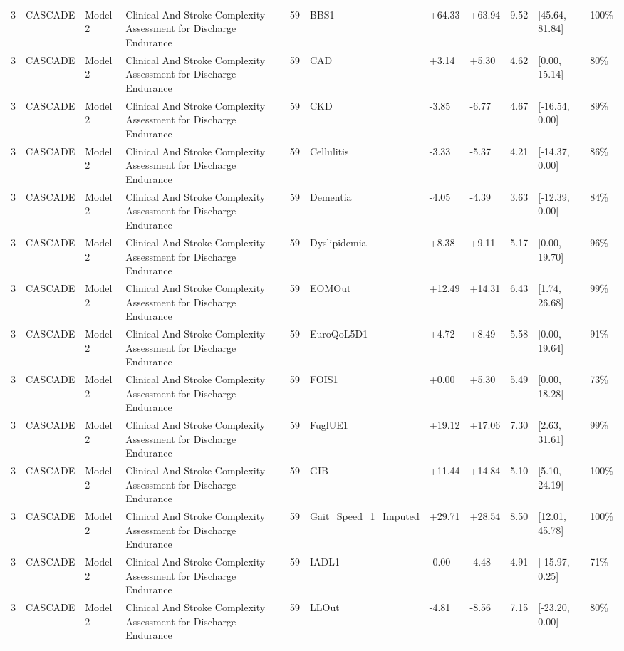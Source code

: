 \begin{tabular}{lllllllllll}
3 & CASCADE & Model 2 & Clinical And Stroke Complexity Assessment for Discharge Endurance & 59 & BBS1 & +64.33 & +63.94 & 9.52 & [45.64, 81.84] & 100\% \\
3 & CASCADE & Model 2 & Clinical And Stroke Complexity Assessment for Discharge Endurance & 59 & CAD & +3.14 & +5.30 & 4.62 & [0.00, 15.14] & 80\% \\
3 & CASCADE & Model 2 & Clinical And Stroke Complexity Assessment for Discharge Endurance & 59 & CKD & -3.85 & -6.77 & 4.67 & [-16.54, 0.00] & 89\% \\
3 & CASCADE & Model 2 & Clinical And Stroke Complexity Assessment for Discharge Endurance & 59 & Cellulitis & -3.33 & -5.37 & 4.21 & [-14.37, 0.00] & 86\% \\
3 & CASCADE & Model 2 & Clinical And Stroke Complexity Assessment for Discharge Endurance & 59 & Dementia & -4.05 & -4.39 & 3.63 & [-12.39, 0.00] & 84\% \\
3 & CASCADE & Model 2 & Clinical And Stroke Complexity Assessment for Discharge Endurance & 59 & Dyslipidemia & +8.38 & +9.11 & 5.17 & [0.00, 19.70] & 96\% \\
3 & CASCADE & Model 2 & Clinical And Stroke Complexity Assessment for Discharge Endurance & 59 & EOMOut & +12.49 & +14.31 & 6.43 & [1.74, 26.68] & 99\% \\
3 & CASCADE & Model 2 & Clinical And Stroke Complexity Assessment for Discharge Endurance & 59 & EuroQoL5D1 & +4.72 & +8.49 & 5.58 & [0.00, 19.64] & 91\% \\
3 & CASCADE & Model 2 & Clinical And Stroke Complexity Assessment for Discharge Endurance & 59 & FOIS1 & +0.00 & +5.30 & 5.49 & [0.00, 18.28] & 73\% \\
3 & CASCADE & Model 2 & Clinical And Stroke Complexity Assessment for Discharge Endurance & 59 & FuglUE1 & +19.12 & +17.06 & 7.30 & [2.63, 31.61] & 99\% \\
3 & CASCADE & Model 2 & Clinical And Stroke Complexity Assessment for Discharge Endurance & 59 & GIB & +11.44 & +14.84 & 5.10 & [5.10, 24.19] & 100\% \\
3 & CASCADE & Model 2 & Clinical And Stroke Complexity Assessment for Discharge Endurance & 59 & Gait\_Speed\_1\_Imputed & +29.71 & +28.54 & 8.50 & [12.01, 45.78] & 100\% \\
3 & CASCADE & Model 2 & Clinical And Stroke Complexity Assessment for Discharge Endurance & 59 & IADL1 & -0.00 & -4.48 & 4.91 & [-15.97, 0.25] & 71\% \\
3 & CASCADE & Model 2 & Clinical And Stroke Complexity Assessment for Discharge Endurance & 59 & LLOut & -4.81 & -8.56 & 7.15 & [-23.20, 0.00] & 80\% \\

\end{tabular}
